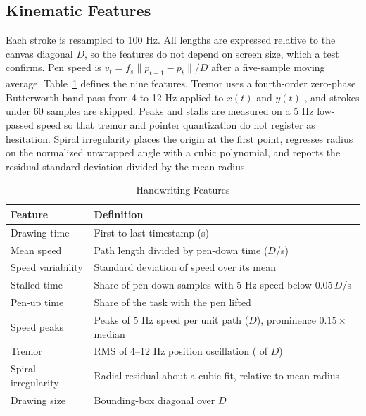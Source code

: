 \documentclass[conference]{IEEEtran}
\begin{document}
\subsection{Kinematic Features}
Each stroke is resampled to 100 Hz. All lengths are expressed relative to the canvas diagonal $D$, so the features do not depend on screen size, which a test confirms. Pen speed is $v_t = f_s\lVert p_{t+1}-p_t\rVert/D$ after a five-sample moving average. Table~\ref{tab:features} defines the nine features. Tremor uses a fourth-order zero-phase Butterworth band-pass from 4 to 12 Hz applied to $x(t)$ and $y(t)$ \cite{scipy}, and strokes under 60 samples are skipped. Peaks and stalls are measured on a 5 Hz low-passed speed so that tremor and pointer quantization do not register as hesitation. Spiral irregularity places the origin at the first point, regresses radius on the normalized unwrapped angle with a cubic polynomial, and reports the residual standard deviation divided by the mean radius.

\begin{table}[t]
\centering
\caption{Handwriting Features}
\label{tab:features}
\footnotesize
\begin{tabular}{@{}p{2.15cm}p{5.5cm}@{}}
\toprule
Feature & Definition \\
\midrule
Drawing time & First to last timestamp (s) \\
Mean speed & Path length divided by pen-down time ($D$/s) \\
Speed variability & Standard deviation of speed over its mean \\
Stalled time & Share of pen-down samples with 5 Hz speed below $0.05\,D$/s \\
Pen-up time & Share of the task with the pen lifted \\
Speed peaks & Peaks of 5 Hz speed per unit path ($D$), prominence $0.15\times$ median \\
Tremor & RMS of 4--12 Hz position oscillation (\textperthousand{} of $D$) \\
Spiral irregularity & Radial residual about a cubic fit, relative to mean radius \\
Drawing size & Bounding-box diagonal over $D$ \\
\bottomrule
\end{tabular}
\end{table}
\end{document}
